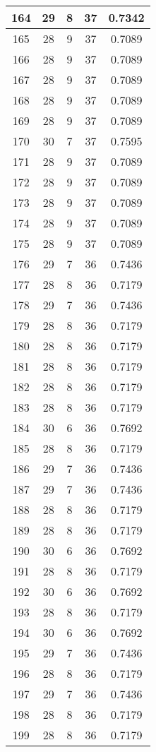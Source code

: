 \documentclass[letterpaper, 12pt]{article}
\begin{document}
\begin{longtable}{|c|c|c|c|c|}
\hline
164 & 29 & 8 & 37 & 0.7342 \\
\hline
165 & 28 & 9 & 37 & 0.7089 \\
\hline
166 & 28 & 9 & 37 & 0.7089 \\
\hline
167 & 28 & 9 & 37 & 0.7089 \\
\hline
168 & 28 & 9 & 37 & 0.7089 \\
\hline
169 & 28 & 9 & 37 & 0.7089 \\
\hline
170 & 30 & 7 & 37 & 0.7595 \\
\hline
171 & 28 & 9 & 37 & 0.7089 \\
\hline
172 & 28 & 9 & 37 & 0.7089 \\
\hline
173 & 28 & 9 & 37 & 0.7089 \\
\hline
174 & 28 & 9 & 37 & 0.7089 \\
\hline
175 & 28 & 9 & 37 & 0.7089 \\
\hline
176 & 29 & 7 & 36 & 0.7436 \\
\hline
177 & 28 & 8 & 36 & 0.7179 \\
\hline
178 & 29 & 7 & 36 & 0.7436 \\
\hline
179 & 28 & 8 & 36 & 0.7179 \\
\hline
180 & 28 & 8 & 36 & 0.7179 \\
\hline
181 & 28 & 8 & 36 & 0.7179 \\
\hline
182 & 28 & 8 & 36 & 0.7179 \\
\hline
183 & 28 & 8 & 36 & 0.7179 \\
\hline
184 & 30 & 6 & 36 & 0.7692 \\
\hline
185 & 28 & 8 & 36 & 0.7179 \\
\hline
186 & 29 & 7 & 36 & 0.7436 \\
\hline
187 & 29 & 7 & 36 & 0.7436 \\
\hline
188 & 28 & 8 & 36 & 0.7179 \\
\hline
189 & 28 & 8 & 36 & 0.7179 \\
\hline
190 & 30 & 6 & 36 & 0.7692 \\
\hline
191 & 28 & 8 & 36 & 0.7179 \\
\hline
192 & 30 & 6 & 36 & 0.7692 \\
\hline
193 & 28 & 8 & 36 & 0.7179 \\
\hline
194 & 30 & 6 & 36 & 0.7692 \\
\hline
195 & 29 & 7 & 36 & 0.7436 \\
\hline
196 & 28 & 8 & 36 & 0.7179 \\
\hline
197 & 29 & 7 & 36 & 0.7436 \\
\hline
198 & 28 & 8 & 36 & 0.7179 \\
\hline
199 & 28 & 8 & 36 & 0.7179 \\
\hline
\end{longtable}
\end{document}

